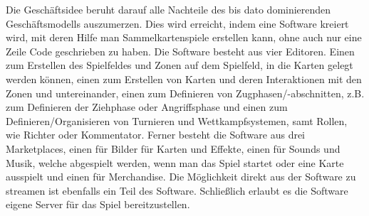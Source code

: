 \documentclass[fontsize=11, a4aper]{scrartcl}
\begin{document}
Die Geschäftsidee beruht darauf alle Nachteile des bis dato dominierenden Geschäftsmodells auszumerzen. Dies wird erreicht, indem eine Software kreiert wird, mit deren Hilfe man Sammelkartenspiele erstellen kann, ohne auch nur eine Zeile Code geschrieben zu haben. Die Software besteht aus vier Editoren. Einen zum Erstellen des Spielfeldes und Zonen auf dem Spielfeld, in die Karten gelegt werden können, einen zum Erstellen von Karten und deren Interaktionen mit den Zonen und untereinander, einen zum Definieren von Zugphasen/-abschnitten, z.B. zum Definieren der Ziehphase oder Angriffsphase und einen zum Definieren/Organisieren von Turnieren und Wettkampfsystemen, samt Rollen, wie Richter oder Kommentator. Ferner besteht die Software aus drei Marketplaces, einen für Bilder für Karten und Effekte, einen für Sounds und Musik, welche abgespielt werden, wenn man das Spiel startet oder eine Karte ausspielt und einen für Merchandise. Die Möglichkeit direkt aus der Software zu streamen ist ebenfalls ein Teil des Software. Schließlich erlaubt es die Software eigene Server für das Spiel bereitzustellen.\hfill\newline
\end{document}
